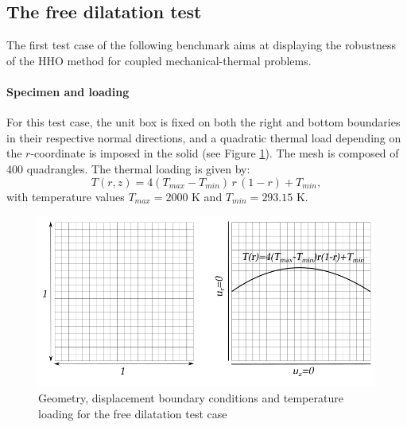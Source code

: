\subsection{The free dilatation test}
\label{sec_satoh_test}

The first test case of the following benchmark aims at displaying the
robustness of the HHO method for coupled mechanical-thermal problems.

\paragraph{Specimen and loading}

For this test case, the unit box is fixed on both the right and
bottom boundaries in their respective normal directions, and a quadratic
thermal load depending on the $r$-coordinate is imposed in the solid
(see Figure \ref{fig_satoh_setting}). The mesh is composed of 400
quadrangles. The thermal loading is given by:
%
%
%
\begin{equation}
    T(r,z) = 4 (T_{max} - T_{min}) \, r \, (1 - r) + T_{min},
\end{equation}
%
%
%
with temperature values $T_{max} = 2000$ K and $T_{min} = 293.15$ K.

\begin{figure}[H]
    \centering
    \includegraphics[width=10.cm]{../chapter_002_hho_mechanics/figures/satoh_setting.png}
    \caption{Geometry, displacement boundary conditions and temperature loading for the free dilatation test case}
    \label{fig_satoh_setting}
\end{figure}

